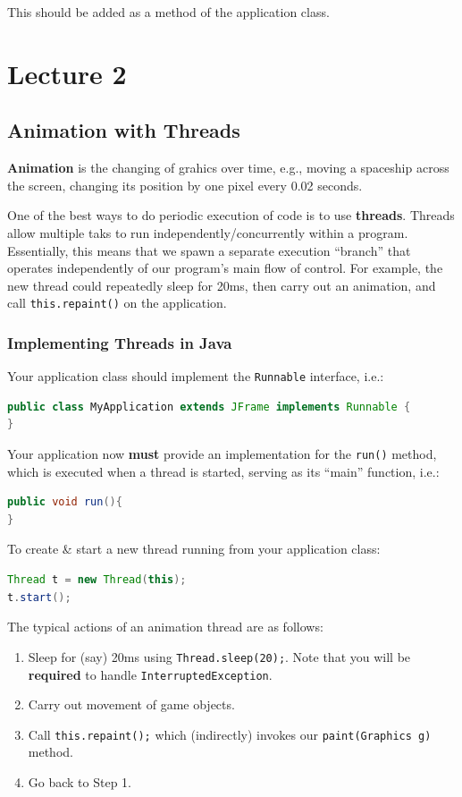 \documentclass[11pt]{article}
\begin{document}
This should be added as a method of the application class.

\section{Lecture 2}         
\subsection{Animation with Threads}

\textbf{Animation} is the changing of grahics over time, e.g., moving a spaceship across the screen, changing its position by 
one pixel every 0.02 seconds. 

One of the best ways to do periodic execution of code is to use \textbf{threads}. 
Threads allow multiple taks to run independently/concurrently within a program. 
Essentially, this means that we spawn a separate execution ``branch'' that operates independently of our program's main flow of control. 
For example, the new thread could repeatedly sleep for 20ms, then carry out an animation, and call \verb|this.repaint()| on the application. 

\subsubsection{Implementing Threads in Java} 
Your application class should implement the \verb|Runnable| interface, i.e.:
\begin{lstlisting}[language=Java]
public class MyApplication extends JFrame implements Runnable {
}
\end{lstlisting}

Your application now \textbf{must} provide an implementation for the \verb|run()| method, which is executed when a thread is started, serving as its ``main'' function, i.e.:
\begin{lstlisting}[language=Java]
public void run(){
}
\end{lstlisting}

To create \& start a new thread running from your application class:
\begin{lstlisting}[language=Java]
Thread t = new Thread(this);
t.start();
\end{lstlisting}

The typical actions of an animation thread are as follows:
\begin{enumerate}
    \item   Sleep for (say) 20ms using \verb|Thread.sleep(20);|. Note that you will be \textbf{required} to handle \verb|InterruptedException|. 
    \item   Carry out movement of game objects. 
    \item   Call \verb|this.repaint();| which (indirectly) invokes our \verb|paint(Graphics g)| method. 
    \item   Go back to Step 1. 
\end{enumerate} 
\end{document}
